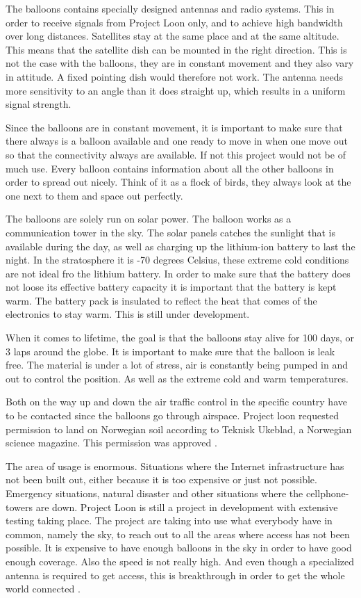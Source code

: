 The balloons contains specially designed antennas and radio systems. This in order to receive signals from Project Loon only, and to achieve high bandwidth over long distances. Satellites stay at the same place and at the same altitude. This means that the satellite dish can be mounted in the right direction. This is not the case with the balloons, they are in constant movement and they also vary in attitude. A fixed pointing dish would therefore not work. The antenna needs more sensitivity to an angle than it does straight up, which results in a uniform signal strength. 

Since the balloons are in constant movement, it is important to make sure that there always is a balloon available and one ready to move in when one move out so that the connectivity always are available. If not this project would not be of much use. Every balloon contains information about all the other balloons in order to spread out nicely. Think of it as a flock of birds, they always look at the one next to them and space out perfectly.

The balloons are solely run on solar power. The balloon works as a communication tower in the sky. The solar panels catches the sunlight that is available during the day, as well as charging up the lithium-ion battery to last the night. In the stratosphere it is -70 degrees Celsius, these extreme cold conditions are not ideal fro the lithium battery. In order to make sure that the battery does not loose its effective battery capacity it is important that the battery is kept warm. The battery pack is insulated to reflect the heat that comes of the electronics to stay warm. This is still under development. 

When it comes to lifetime, the goal is that the balloons stay alive for 100 days, or 3 laps around the globe. It is important to make sure that the balloon is leak free. The material is under a lot of stress, air is constantly being pumped in and out to control the position. As well as the extreme cold and warm temperatures. 

Both on the way up and down the air traffic control in the specific country have to be contacted since the balloons go through airspace. Project loon requested permission to land on Norwegian soil according to Teknisk Ukeblad, a Norwegian science magazine. This permission was approved \cite{loonTU}.

The area of usage is enormous. Situations where the Internet infrastructure has not been built out, either because it is too expensive or just not possible. Emergency situations, natural disaster and other situations where the cellphone-towers are down. Project Loon is still a project in development with extensive testing taking place. The project are taking into use what everybody have in common, namely the sky, to reach out to all the areas where access has not been possible. It is expensive to have enough balloons in the sky in order to have good enough coverage. Also the speed is not really high. And even though a specialized antenna is required to get access, this is breakthrough in order to get the whole world connected \cite{loonYouTube, loonNorsk}.


